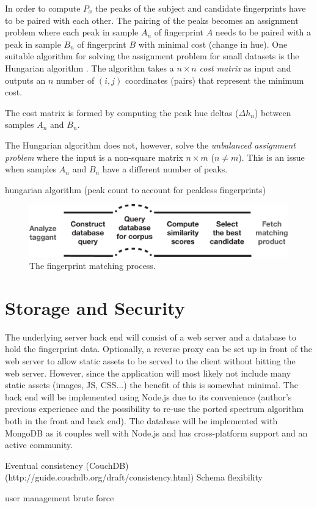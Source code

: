 \documentclass[thesis.tex]{subfiles}
\begin{document}
In order to compute $P_x$ the peaks of the subject and candidate fingerprints have to be paired with each other. The pairing of the peaks becomes an assignment problem where each peak in sample $A_n$ of fingerprint $A$ needs to be paired with a peak in sample $B_n$ of fingerprint $B$ with minimal cost (change in hue). One suitable algorithm for solving the assignment problem for small datasets is the Hungarian algorithm \cite{hungarian_algorithm}. The algorithm takes a $n \times n$ \emph{cost matrix} as input and outputs an $n$ number of $(i, j)$ coordinates (pairs) that represent the minimum cost.

The cost matrix is formed by computing the peak hue deltas ($\Delta{h_n}$) between samples $A_n$ and $B_n$.


The Hungarian algorithm does not, however, solve the \emph{unbalanced assignment problem} where the input is a non-square matrix $n \times m$ ($n \neq m$). This is an issue when samples $A_n$ and $B_n$ have a different number of peaks.

hungarian algorithm (peak count to account for peakless fingerprints)

\begin{figure}[h]
\centering \includegraphics[width=\textwidth,height=\textheight,keepaspectratio=true]{images/design_implementation/matching_process}
\caption{The fingerprint matching process.\label{figure:matching-process}}
\end{figure}

\section{Storage and Security}
\label{chapter:storage-security}

The underlying server back end will consist of a web server and a database to hold the fingerprint data. Optionally, a reverse proxy can be set up in front of the web server to allow static assets to be served to the client without hitting the web server. However, since the application will most likely not include many static assets (images, JS, CSS...) the benefit of this is somewhat minimal. The back end will be implemented using Node.js due to its convenience (author's previous experience and the possibility to re-use the ported spectrum algorithm both in the front and back end). The database will be implemented with MongoDB as it couples well with Node.js and has cross-platform support and an active community.

Eventual consistency (CouchDB) (http://guide.couchdb.org/draft/consistency.html)
Schema flexibility

user management brute force
\end{document}
